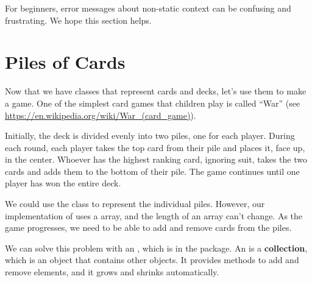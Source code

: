 For beginners, error messages about non-static context can be confusing and frustrating.
We hope this section helps.


%


\section{Piles of Cards}


Now that we have classes that represent cards and decks, let's use them to make a game.
One of the simplest card games that children play is called ``War'' (see \url{https://en.wikipedia.org/wiki/War_(card_game)}).

Initially, the deck is divided evenly into two piles, one for each player.
During each round, each player takes the top card from their pile and places it, face up, in the center.
Whoever has the highest ranking card, ignoring suit, takes the two cards and adds them to the bottom of their pile.
The game continues until one player has won the entire deck.

We could use the  class to represent the individual piles.
However, our implementation of  uses a  array, and the length of an array can't change.
As the game progresses, we need to be able to add and remove cards from the piles.


We can solve this problem with an , which is in the  package.
An  is a {\bf collection}, which is an object that contains other objects.
It provides methods to add and remove elements, and it grows and shrinks automatically.


